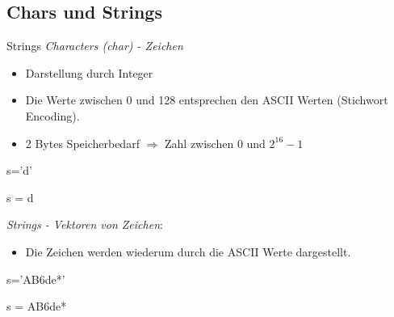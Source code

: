 \documentclass[hyperref={xetex}]{beamer}
\begin{document}
\subsection{Chars und Strings}
%
%
\begin{frame}[fragile]{Strings }
\emph{Characters (char) - Zeichen}
\begin{itemize}
 \item Darstellung durch Integer
 \item Die Werte zwischen 0 und 128 entsprechen den ASCII Werten (Stichwort Encoding). 
\item 2 Bytes Speicherbedarf $\Rightarrow$ Zahl zwischen 0 und $2^{16}-1$ 
\end{itemize}

\begin{matlabin}
s='d'
\end{matlabin}
\begin{matlab}
s = d
\end{matlab}
\emph{Strings - Vektoren von Zeichen}:
\begin{itemize}
\item Die Zeichen werden wiederum durch die ASCII Werte dargestellt.
\end{itemize}
\begin{matlabin}
s='AB6de*'
\end{matlabin}  
\begin{matlab}
s =
AB6de*
\end{matlab}
\end{frame}
%
%
\end{document}
